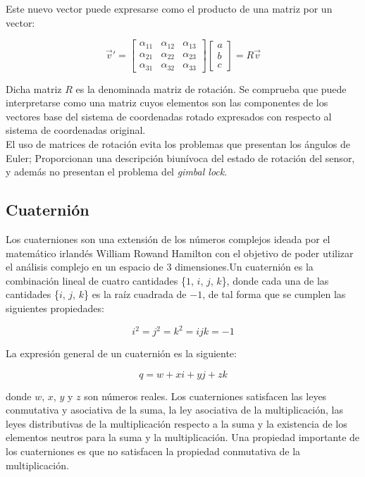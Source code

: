 \documentclass[10pt, a4paper]{report}
\begin{document}
Este nuevo vector puede expresarse como el producto de una matriz por un vector:

$$ \vec{v}' = \begin{bmatrix}  \alpha_{11} & \alpha_{12} & \alpha_{13} \\ \alpha_{21} & \alpha_{22} & \alpha_{23}\\ \alpha_{31} & \alpha_{32} & \alpha_{33} \end{bmatrix} \begin{bmatrix} a \\ b \\ c \end{bmatrix} = R \vec{v}$$

Dicha matriz $R$ es la denominada matriz de rotación. Se comprueba que puede interpretarse como una matriz cuyos elementos son las componentes de los vectores base del sistema de coordenadas rotado expresados con respecto al sistema de coordenadas original.\\

El uso de matrices de rotación evita los problemas que presentan los ángulos de Euler; Proporcionan una descripción biunívoca del estado de rotación del sensor, y además no presentan el problema del \textit{gimbal lock}. 

\subsection{Cuaternión}

Los cuaterniones son una extensión de los números complejos ideada por el matemático irlandés William Rowand Hamilton con el objetivo de poder utilizar el análisis complejo en un espacio de 3 dimensiones.Un cuaternión es la combinación lineal de cuatro cantidades \{$1$, $i$, $j$, $k$\}, donde cada una de las cantidades \{$i$, $j$, $k$\} es la raíz cuadrada de $-1$, de tal forma que se cumplen las siguientes propiedades:

$$ i^2 = j^2 = k^2 = ijk = -1 $$

La expresión general de un cuaternión es la siguiente:

$$ q = w + xi + yj + zk $$

donde $w$, $x$, $y$ y $z$ son números reales. Los cuaterniones satisfacen las leyes conmutativa y asociativa de la suma, la ley asociativa de la multiplicación, las leyes distributivas de la multiplicación respecto a la suma y la existencia de los elementos neutros para la suma y la multiplicación. Una propiedad importante de los cuaterniones es que no satisfacen la propiedad conmutativa de la multiplicación.
\end{document}
